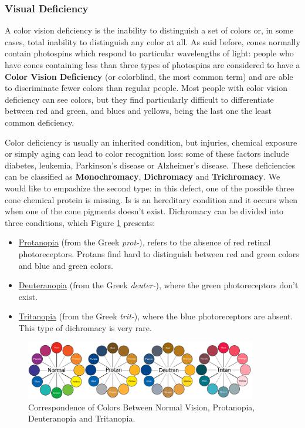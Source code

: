 \subsubsection{Visual Deficiency}
\label{subsubsec:visual_deficiencies}
%
A color vision deficiency is the inability to distinguish a set of colors or, in some cases, total
inability to distinguish any color at all. As said before, cones normally contain photospins which respond
to particular wavelengths of light: people who have cones containing less than three types of photospins are considered to have a \textbf{Color Vision Deficiency} (or colorblind, the most common term)
and are able to discriminate fewer colors than regular people. Most people with color vision deficiency can
see colors, but they find particularly difficult to differentiate between red and green, and blues and
yellows, being the last one the least common deficiency. \par
Color deficiency is usually an inherited condition, but injuries, chemical exposure or simply aging can lead to color
recognition loss: some of these factors include diabetes, leukemia, Parkinson’s disease or Alzheimer’s
disease. These deficiencies can be classified as \textbf{Monochromacy}, \textbf{Dichromacy} and \textbf{Trichromacy}.
We would like to empashize the second type: in this defect, one of the possible three cone chemical protein is
missing. Is is an hereditary condition and it occurs when when one of the cone pigments doesn’t exist.
Dichromacy can be divided into three conditions, which Figure \ref{fig:correscolorblind} presents: \par
%
\begin{itemize}
	\setlength\itemsep{0.01em}
	\item \ul{Protanopia} (from the Greek \emph{prot-}), refers to the absence of red retinal
    photoreceptors.
    Protans find hard to distinguish between red and green colors and blue and green colors.
  \item \ul{Deuteranopia} (from the Greek \emph{deuter-}), where the green photoreceptors don’t
    exist.
  \item \ul{Tritanopia} (from the Greek \emph{trit-}), where the blue photoreceptors are absent.
    This type of dichromacy is very rare.
\end{itemize} \par
%
\begin{figure}[H]
	\centering
    \vspace{-10pt}
    \includegraphics[width=0.9\textwidth]{images/background/ColorBlindnessCorrespondance.png}
    \caption[Correspondance of Colors Between Visual Deficiencies]{Correspondence of Colors Between Normal Vision,
    Protanopia, Deuteranopia and Tritanopia.\protect\footnotemark{}}
    \vspace{-10pt}
    \label{fig:correscolorblind}
\end{figure}

